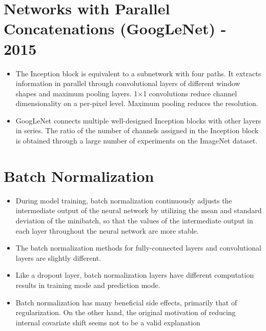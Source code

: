 \documentclass[12pt,notitlepage]{article}
\begin{document}
\section{ Networks with Parallel Concatenations (GoogLeNet) - 2015 }
\begin{itemize}
  \item The Inception block is equivalent to a subnetwork with four paths. It extracts information in parallel through convolutional layers of different window shapes and maximum pooling layers.  1×1  convolutions reduce channel dimensionality on a per-pixel level. Maximum pooling reduces the resolution.
  \item GoogLeNet connects multiple well-designed Inception blocks with other layers in series. The ratio of the number of channels assigned in the Inception block is obtained through a large number of experiments on the ImageNet dataset.
\end{itemize}

\section{Batch Normalization}
\begin{itemize}
  \item During model training, batch normalization continuously adjusts the intermediate output of the neural network by utilizing the mean and standard deviation of the minibatch, so that the values of the intermediate output in each layer throughout the neural network are more stable.
  \item The batch normalization methods for fully-connected layers and convolutional layers are slightly different.
  \item Like a dropout layer, batch normalization layers have different computation results in training mode and prediction mode.
  \item Batch normalization has many beneficial side effects, primarily that of regularization. On the other hand, the original motivation of reducing internal covariate shift seems not to be a valid explanation
\end{itemize}

\vfill

\nocite{zhang2020dive}
\end{document}
